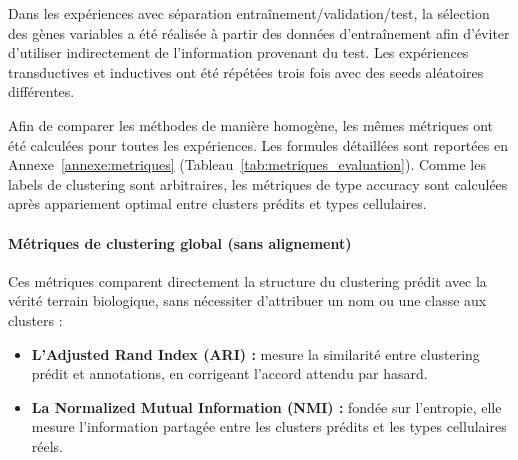 Dans les expériences avec séparation entraînement/validation/test, la sélection des gènes variables a été réalisée à partir des données d'entraînement afin d'éviter d'utiliser indirectement de l'information provenant du test. Les expériences transductives et inductives ont été répétées trois fois avec des seeds aléatoires différentes. 

Afin de comparer les méthodes de manière homogène, les mêmes métriques ont été calculées pour toutes les expériences. Les formules détaillées sont reportées en Annexe~\ref{annexe:metriques} (Tableau~\ref{tab:metriques_evaluation}). Comme les labels de clustering sont arbitraires, les métriques de type accuracy sont calculées après appariement optimal entre clusters prédits et types cellulaires.

\paragraph{Métriques de clustering global (sans alignement)}
Ces métriques comparent directement la structure du clustering prédit avec la vérité terrain biologique, sans nécessiter d'attribuer un nom ou une classe aux clusters :
\begin{itemize}
    \item \textbf{L'Adjusted Rand Index (ARI) :} mesure la similarité entre clustering prédit et annotations, en corrigeant l'accord attendu par hasard.
    \item \textbf{La Normalized Mutual Information (NMI) :} fondée sur l'entropie, elle mesure l'information partagée entre les clusters prédits et les types cellulaires réels.
\end{itemize}

